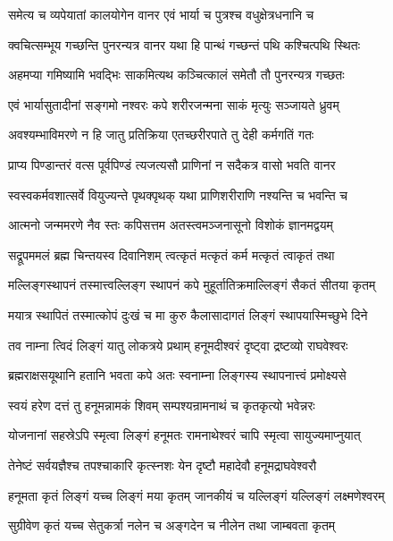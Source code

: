 \twolineshloka
{समेत्य च व्यपेयातां कालयोगेन वानर}
{एवं भार्या च पुत्रश्च वधुक्षेत्रधनानि च}%

\twolineshloka
{क्वचित्सम्भूय गच्छन्ति पुनरन्यत्र वानर}
{यथा हि पान्थं गच्छन्तं पथि कश्चित्पथि स्थितः}%

\twolineshloka
{अहमप्या गमिष्यामि भवद्भिः साकमित्यथ}
{कञ्चित्कालं समेतौ तौ पुनरन्यत्र गच्छतः}%

\twolineshloka
{एवं भार्यासुतादीनां सङ्गमो नश्वरः कपे}
{शरीरजन्मना साकं मृत्युः सञ्जायते ध्रुवम्}%

\twolineshloka
{अवश्यम्भाविमरणे न हि जातु प्रतिक्रिया}
{एतच्छरीरपाते तु देही कर्मगतिं गतः}%

\twolineshloka
{प्राप्य पिण्डान्तरं वत्स पूर्वपिण्डं त्यजत्यसौ}
{प्राणिनां न सदैकत्र वासो भवति वानर}%

\twolineshloka
{स्वस्वकर्मवशात्सर्वे वियुज्यन्ते पृथक्पृथक्}
{यथा प्राणिशरीराणि नश्यन्ति च भवन्ति च}%

\twolineshloka
{आत्मनो जन्ममरणे नैव स्तः कपिसत्तम}
{अतस्त्वमञ्जनासूनो विशोकं ज्ञानमद्वयम्}%

\twolineshloka
{सद्रूपममलं ब्रह्म चिन्तयस्व दिवानिशम्}
{त्वत्कृतं मत्कृतं कर्म मत्कृतं त्वाकृतं तथा}%

\twolineshloka
{मल्लिङ्गस्थापनं तस्मात्त्वल्लिङ्ग स्थापनं कपे}
{मुहूर्तातिक्रमाल्लिङ्गं सैकतं सीतया कृतम्}%

\twolineshloka
{मयात्र स्थापितं तस्मात्कोपं दुःखं च मा कुरु}
{कैलासादागतं लिङ्गं स्थापयास्मिच्छुभे दिने}%

\twolineshloka
{तव नाम्ना त्विदं लिङ्गं यातु लोकत्रये प्रथाम्}
{हनूमदीश्वरं दृष्ट्वा द्रष्टव्यो राघवेश्वरः}%

\twolineshloka
{ब्रह्मराक्षसयूथानि हतानि भवता कपे}
{अतः स्वनाम्ना लिङ्गस्य स्थापनात्त्वं प्रमोक्ष्यसे}%

\twolineshloka
{स्वयं हरेण दत्तं तु हनूमन्नामकं शिवम्}
{सम्पश्यन्रामनाथं च कृतकृत्यो भवेन्नरः}%

\twolineshloka
{योजनानां सहस्रेऽपि स्मृत्वा लिङ्गं हनूमतः}
{रामनाथेश्वरं चापि स्मृत्वा सायुज्यमाप्नुयात्}%

\twolineshloka
{तेनेष्टं सर्वयज्ञैश्च तपश्चाकारि कृत्स्नशः}
{येन दृष्टौ महादेवौ हनूमद्राघवेश्वरौ}%

\twolineshloka
{हनूमता कृतं लिङ्गं यच्च लिङ्गं मया कृतम्}
{जानकीयं च यल्लिङ्गं यल्लिङ्गं लक्ष्मणेश्वरम्}%

\twolineshloka
{सुग्रीवेण कृतं यच्च सेतुकर्त्रा नलेन च}
{अङ्गदेन च नीलेन तथा जाम्बवता कृतम्}%

